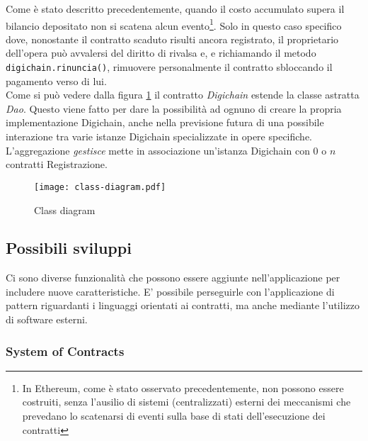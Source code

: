 	Come è stato descritto precedentemente, quando il costo accumulato supera il bilancio depositato non si scatena alcun evento\footnote{In Ethereum, come è stato osservato precedentemente, non possono essere costruiti, senza l'ausilio di sistemi (centralizzati) esterni dei meccanismi che prevedano lo scatenarsi di eventi sulla base di stati dell'esecuzione dei contratti}. Solo in questo caso specifico dove, nonostante il contratto scaduto risulti ancora registrato, il proprietario dell'opera può avvalersi del diritto di rivalsa e, e richiamando il metodo \lstinline|digichain.rinuncia()|, rimuovere personalmente il contratto sbloccando il pagamento verso di lui.\\
	

	
	Come si può vedere dalla figura \ref{fig:class-diagram} il contratto \textit{Digichain} estende la classe astratta \textit{Dao}. Questo viene fatto per dare la possibilità ad ognuno di creare la propria implementazione Digichain, anche nella previsione futura di una possibile interazione tra varie istanze Digichain specializzate in opere specifiche. L'aggregazione \textit{gestisce} mette in associazione un'istanza Digichain con $0$ o $n$ contratti Registrazione. 
	
	
			\begin{figure}
				\caption{Class diagram}
				\centering
				\texttt{[image: class-diagram.pdf]}
				\label{fig:class-diagram}
			\end{figure}
	
	
	
	\subsection{Possibili sviluppi}
	
	Ci sono diverse funzionalità che possono essere aggiunte nell'applicazione per includere nuove caratteristiche. E' possibile perseguirle con l'applicazione di pattern riguardanti i linguaggi orientati ai contratti, ma anche mediante l'utilizzo di software esterni. 
	
	\subsubsection{System of Contracts}\label{sssec:systemofcontracts}
	
